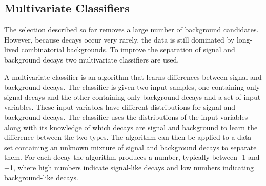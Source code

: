 



\subsection{Multivariate Classifiers}
\label{sec:MVC}

The selection described so far removes a large number of background candidates. However, because \bmumu decays occur very rarely, the data is still dominated by long-lived combinatorial backgrounds. To improve the separation of signal and background decays two multivariate classifiers are used.

A multivariate classifier is an algorithm that learns differences between signal and background decays. The classifier is given two input samples, one containing only signal decays and the other containing only background decays and a set of input variables. These input variables have different distributions for signal and background decays. The classifier uses the distributions of the input variables along with its knowledge of which decays are signal and background to learn the difference between the two types. The algorithm can then be applied to a data set containing an unknown mixture of signal and background decays to separate them. For each decay the algorithm produces a number, typically between -1 and +1, where high numbers indicate signal-like decays and low numbers indicating background-like decays. %

